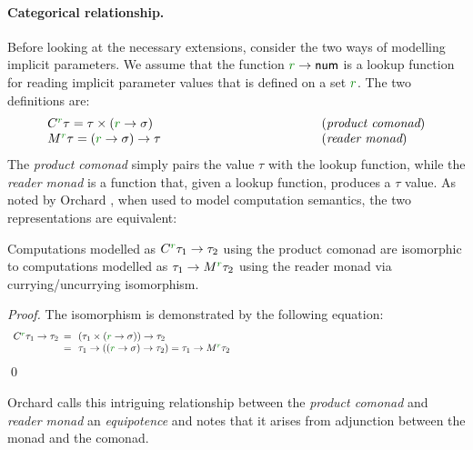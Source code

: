 \paragraph{Categorical relationship.}
Before looking at the necessary extensions, consider the two ways of modelling implicit
parameters. We assume that the function $\cclrd{r} \rightarrow \ident{num}$ is a lookup function
for reading implicit parameter values that is defined on a set $\cclrd{r}$. The two definitions
are:
%
\begin{equation*}
\begin{array}{lll}
 \ctyp{\cclrd{r}}\tau = \tau \times (\cclrd{r} \rightarrow \sigma) &~\hspace{10em}~& (\emph{product comonad}) \\
 \mtyp{\cclrd{r}}\tau = (\cclrd{r} \rightarrow \sigma) \rightarrow \tau && (\emph{reader monad})
\end{array}
\end{equation*}
%
The \emph{product comonad} simply pairs the value $\tau$ with the lookup function, while
the \emph{reader monad} is a function that, given a lookup function, produces a $\tau$ value.
As noted by Orchard \cite{comonads-vs-monads}, when used to model computation semantics, the
two representations are equivalent:
%
\begin{remark}
Computations modelled as $\ctyp{\cclrd{r}}{\tau_1}\rightarrow\tau_2$ using the product comonad
are isomorphic to computations modelled as $\tau_1\rightarrow\mtyp{\cclrd{r}}{\tau_2}$ using the
reader monad via currying/uncurrying isomorphism.
\end{remark}
\begin{proof}
The isomorphism is demonstrated by the following equation:
\begin{equation*}
\begin{array}{lll}
 \ctyp{\cclrd{r}}{\tau_1} \rightarrow \tau_2 &\narrow{=}&
 (\tau_1 \times (\cclrd{r} \rightarrow \sigma)) \rightarrow \tau_2 \\
 &\narrow{=}& \tau_1 \rightarrow ((\cclrd{r} \rightarrow \sigma) \rightarrow \tau_2) =
 \tau_1 \rightarrow \mtyp{\cclrd{r}}{\tau_2} \hspace{23em}\qedhere \\
\end{array}
\end{equation*}
\qed
\end{proof}

\noindent
Orchard \cite{comonads-dom-thesis} calls this intriguing relationship between the 
\emph{product comonad} and \emph{reader monad} an \emph{equipotence} and notes that it 
arises from adjunction between the monad and the comonad. 

